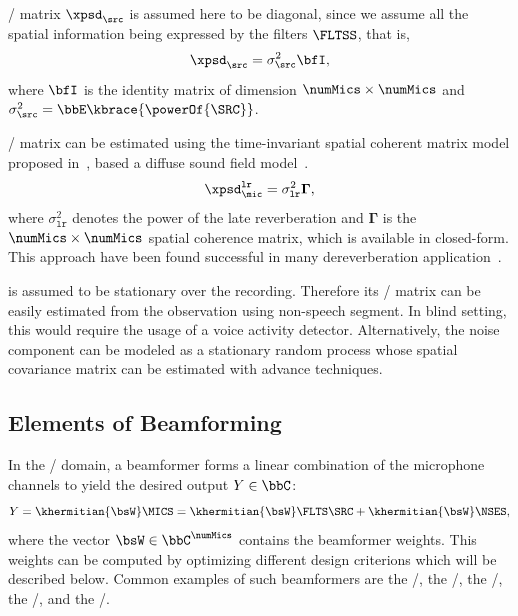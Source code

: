  \xPSD/ matrix $\xpsd_\src$ is assumed here to be diagonal, since we assume all the spatial information being expressed by the filters $\FLTSS$, that is,
\begin{equation}
    \xpsd_\src = \sigma_\src^2 \bfI
    ,
\end{equation}
where $\bfI$ is the identity matrix of dimension $\numMics \times \numMics$ and $\sigma_\src^2 = \bbE\kbrace{\powerOf{\SRC}}$.

 \xPSD/ matrix can be estimated using the time-invariant spatial coherent matrix model proposed in~, based a diffuse sound field model~.
\begin{equation}\label{eq:dechorateapp:gamma}
    \xpsd^{\mathtt{lr}}_{\mic} = \sigma_\mathtt{lr}^2\mathbf{\Gamma}
    ,
\end{equation}
where $\sigma_\mathtt{lr}^2$ denotes the power of the late reverberation and $\mathbf{\Gamma}$ is the $\numMics \times \numMics$ spatial coherence matrix, which is available in closed-form.
This approach have been found successful in many dereverberation application~.

 is assumed to be stationary over the recording.
Therefore its \xPSD/ matrix can be easily estimated from the observation using non-speech segment.
In blind setting, this would require the usage of a voice activity detector.
Alternatively, the noise component can be modeled as a stationary random process whose spatial covariance matrix can be estimated with advance techniques.

\subsection{Elements of Beamforming}
In the \STFT/ domain, a beamformer forms a linear combination of the microphone channels to yield the desired output $Y \in \bbC$:
\begin{equation*}
    Y = \khermitian{\bsW} \MICS = \khermitian{\bsW} \FLTS \SRC + \khermitian{\bsW} \NSES,
\end{equation*}
where the vector $\bsW \in \bbC^{\numMics}$ contains the beamformer weights.
This weights can be computed by optimizing different design criterions which will be described below.
Common examples of such beamformers are the \DStxt/, the \MVDRtxt/, the \MaxSNRtxt/, the \MaxSINRtxt/, and the \LCMVtxt/.

